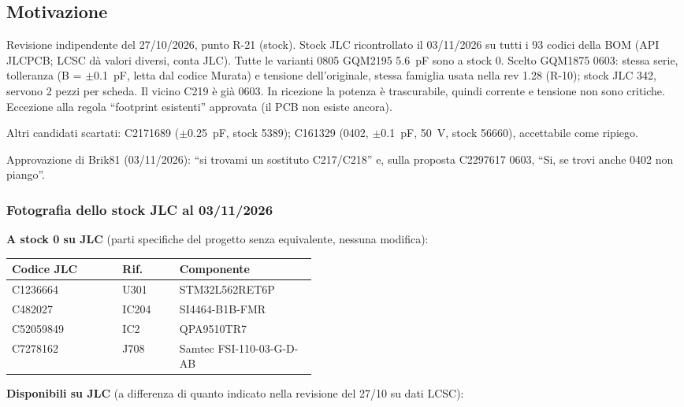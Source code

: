 \subsection{Motivazione}
Revisione indipendente del 27/10/2026, punto R-21 (stock). Stock JLC ricontrollato il 03/11/2026 su tutti i 93 codici della BOM (API JLCPCB; LCSC dà valori diversi, conta JLC). Tutte le varianti 0805 GQM2195 \SI{5,6}{\pico\farad} sono a stock 0. Scelto GQM1875 0603: stessa serie, tolleranza (B = $\pm$\SI{0,1}{\pico\farad}, letta dal codice Murata) e tensione dell'originale, stessa famiglia usata nella rev 1.28 (R-10); stock JLC 342, servono 2 pezzi per scheda. Il vicino C219 è già 0603. In ricezione la potenza è trascurabile, quindi corrente e tensione non sono critiche. Eccezione alla regola \textquotedblleft{}footprint esistenti\textquotedblright{} approvata (il PCB non esiste ancora).

Altri candidati scartati:  C2171689 ($\pm$\SI{0,25}{\pico\farad}, stock 5389);  C161329 (0402, $\pm$\SI{0,1}{\pico\farad}, \SI{50}{\volt}, stock 56660), accettabile come ripiego.

Approvazione di Brik81 (03/11/2026): \textquotedblleft{}si trovami un sostituto C217/C218\textquotedblright{} e, sulla proposta C2297617 0603, \textquotedblleft{}Si, se trovi anche 0402 non piango\textquotedblright{}.

\subsubsection*{Fotografia dello stock JLC al 03/11/2026}
\textbf{A stock 0 su JLC} (parti specifiche del progetto senza equivalente, nessuna modifica):

{\small{}
\begin{tabular}{@{}llp{0.45\linewidth}@{}}
\toprule
\textbf{Codice JLC} & \textbf{Rif.} & \textbf{Componente}\\
\midrule
C1236664 & U301 & STM32L562RET6P\\
C482027 & IC204 & SI4464-B1B-FMR\\
C52059849 & IC2 & QPA9510TR7\\
C7278162 & J708 & Samtec FSI-110-03-G-D-AB\\
\bottomrule
\end{tabular}}

\medskip
\textbf{Disponibili su JLC} (a differenza di quanto indicato nella revisione del 27/10 su dati LCSC):

